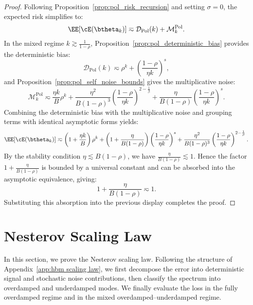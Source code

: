 \begin{proof}
Following Proposition~\ref{prop:pol_risk_recursion} and setting \(\sigma=0\), the expected risk simplifies to:
\[
    \EE[\cE(\btheta_k)]
    \eqsim
    \mathcal{D}_{\mathrm{Pol}}(k)
    +
    \mathcal M_k^{\mathrm{Pol}}.
\]
In the mixed regime \(k \gtrsim \frac{1}{1-\rho}\), Proposition~\ref{prop:pol_deterministic_bias} provides the deterministic bias:
\[
    \mathcal{D}_{\mathrm{Pol}}(k)
    \eqsim
    \rho^k
    +
    \left(\frac{1-\rho}{\eta k}\right)^s,
\]
and Proposition~\ref{prop:pol_self_noise_bounds} gives the multiplicative noise:
\[
    \mathcal M_k^{\mathrm{Pol}}
    \eqsim
    \frac{\eta k}{B}\rho^k
    +
    \frac{\eta^2}{B(1-\rho)^3}
    \left(\frac{1-\rho}{\eta k}\right)^{2-\frac1\beta}
    +
    \frac{\eta}{B(1-\rho)}
    \left(\frac{1-\rho}{\eta k}\right)^s.
\]
Combining the deterministic bias with the multiplicative noise and grouping terms with identical asymptotic forms yields:
\[
    \EE[\cE(\btheta_k)]
    \eqsim
    \left(1+\frac{\eta k}{B}\right)\rho^k
    +
    \left(
        1+\frac{\eta}{B(1-\rho)}
    \right)
    \left(\frac{1-\rho}{\eta k}\right)^s
    +
    \frac{\eta^2}{B(1-\rho)^3}
    \left(\frac{1-\rho}{\eta k}\right)^{2-\frac1\beta}.
\]
By the stability condition \(\eta \lesssim B(1-\rho)\), we have \(\frac{\eta}{B(1-\rho)} \lesssim 1\). Hence the factor \(1+\frac{\eta}{B(1-\rho)}\) is bounded by a universal constant and can be absorbed into the asymptotic equivalence, giving:
\[
    1+\frac{\eta}{B(1-\rho)} \eqsim 1.
\]
Substituting this absorption into the previous display completes the proof.
\end{proof}






\newpage
\section{Nesterov Scaling Law}
\label{app:nesterov scaling law}

In this section, we prove the Nesterov scaling law. Following the structure of Appendix~\ref{app:hbm scaling law}, we first decompose the error into deterministic signal and stochastic noise contributions, then classify the spectrum into overdamped and underdamped modes. We finally evaluate the loss in the fully overdamped regime and in the mixed overdamped--underdamped regime. 

